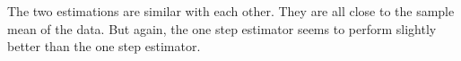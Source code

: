 \documentclass[letterpaper,12pt]{article}
\theoremstyle{definition}
\numberwithin{equation}{section}
\begin{document}
\begin{enumerate} [\bfseries (a)]
The two estimations are similar with each other. They are all close to the sample mean of the data. But again, the one step estimator seems to perform slightly better than the one step estimator. 

\end{enumerate}
\end{document}
